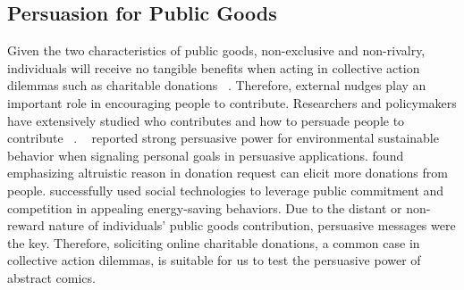 \subsection{Persuasion for Public Goods}
Given the two characteristics of public goods, non-exclusive and non-rivalry, individuals will receive no tangible benefits when acting in collective action dilemmas such as charitable donations ~\cite{marwell1981economists,isaac1982public}. Therefore, external nudges play an important role in encouraging people to contribute. Researchers and policymakers have extensively studied who contributes and how to persuade people to contribute ~\cite{olson2009logic,becker1974theory,andreoni1990impure,miguel2005ethnic,burnett1981psychographic,pessemier1977willingness,burnett1981psychographic}.  ~\textcite{midden2008using} reported strong persuasive power for environmental sustainable behavior when signaling personal goals in persuasive applications. \textcite{feiler2012mixed} found emphasizing altruistic reason in donation request can elicit more donations from people. \textcite{mankoff2010stepgreen} successfully used social technologies to leverage public commitment and competition in appealing energy-saving behaviors. Due to the distant or non-reward nature of individuals' public goods contribution, persuasive messages were the key. Therefore, soliciting online charitable donations, a common case in collective action dilemmas, is suitable for us to test the persuasive power of abstract comics.

